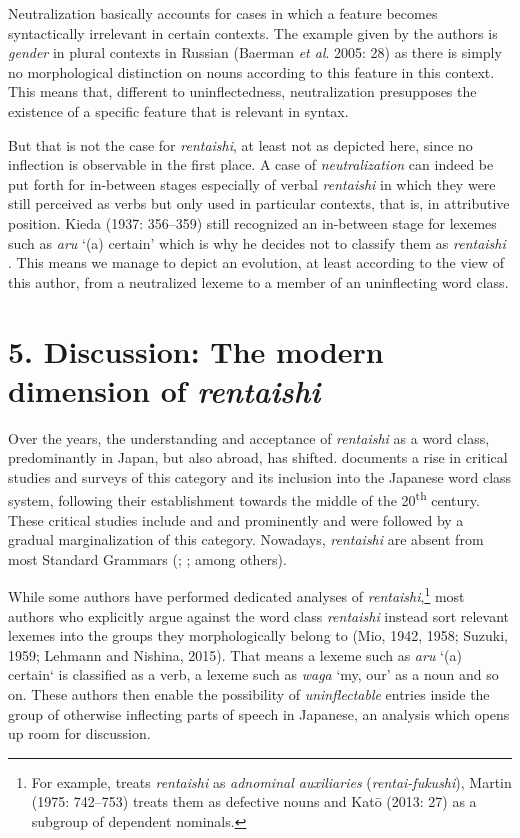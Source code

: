 \documentclass[output=paper]{langscibook}
\begin{document}
Neutralization basically accounts for cases in which a feature becomes syntactically irrelevant in certain contexts. The example given by the authors is \textit{gender} in plural contexts in Russian (Baerman \textit{et al}. 2005: 28) as there is simply no morphological distinction on nouns according to this feature in this context. This means that, different to uninflectedness, neutralization presupposes the existence of a specific feature that is relevant in syntax.

But that is not the case for \textit{rentaishi}, at least not as depicted here, since no inflection is observable in the first place. A case of \textit{neutralization} can indeed be put forth for in-between stages especially of verbal \textit{rentaishi} in which they were still perceived as verbs but only used in particular contexts, that is, in attributive position. Kieda (1937: 356–359) still recognized an in-between stage for lexemes such as \textit{aru} ‘(a) certain’ which is why he decides not to classify them as \textit{rentaishi} \citep[359]{Kieda1937}. This means we manage to depict an evolution, at least according to the view of this author, from a neutralized lexeme to a member of an uninflecting word class.

\section{5. Discussion: The modern dimension of \textit{rentaishi}}

Over the years, the understanding and acceptance of \textit{rentaishi} as a word class, predominantly in Japan, but also abroad, has shifted. \citet[53]{Komatsu1973} documents a rise in critical studies and surveys of this category and its inclusion into the Japanese word class system, following their establishment towards the middle of the 20\textsuperscript{th} century. These critical studies include \citet{Tokuda1934} and \citet{Suzuki1959} and prominently \citet{Watanabe1971} and were followed by a gradual marginalization of this category. Nowadays, \textit{rentaishi} are absent from most Standard Grammars (\citealt{Hinds1988}; \citealt{Tsujimura2014}; \citealt{Hasegawa2015} among others).

While some authors have performed dedicated analyses of \textit{rentaishi},\footnote{For example, \citet{Watanabe1971} treats \textit{rentaishi} as \textit{adnominal auxiliaries} (\textit{rentai-fukushi}), Martin (1975: 742–753) treats them as defective nouns and Katō (2013: 27) as a subgroup of dependent nominals.}  most authors who explicitly argue against the word class \textit{rentaishi} instead sort relevant lexemes into the groups they morphologically belong to (Mio, 1942, 1958; Suzuki, 1959; Lehmann and Nishina, 2015). That means a lexeme such as \textit{aru} ‘(a) certain‘ is classified as a verb, a lexeme such as \textit{waga} ‘my, our’ as a noun and so on. These authors then enable the possibility of \textit{uninflectable} entries inside the group of otherwise inflecting parts of speech in Japanese, an analysis which opens up room for discussion.
\end{document}
